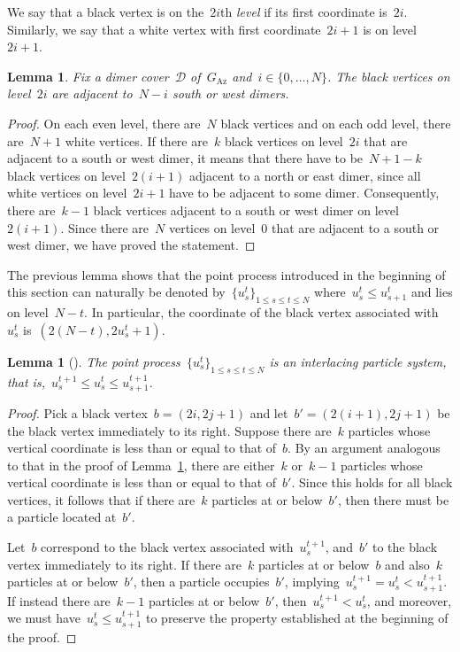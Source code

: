\documentclass[11pt]{article}
\theoremstyle{plain}
\newtheorem{lemma}[theorem]{Lemma}
\theoremstyle{definition}
\numberwithin{equation}{section}
\begin{document}
We say that a black vertex is on the~$2i$th \emph{level} if its first coordinate is~$2i$. Similarly, we say that a white vertex with first coordinate~$2i+1$ is on level~$2i+1$.
\begin{lemma}\label{lem:particles_level}
Fix a dimer cover~$\mathcal D$ of~$G_\text{Az}$ and~$i\in \{0,\dots,N\}$. The black vertices on level~$2i$ are adjacent to~$N-i$ south or west dimers.   
\end{lemma}
\begin{proof}
On each even level, there are~$N$ black vertices and on each odd level, there are~$N+1$ white vertices. If there are~$k$ black vertices on level~$2i$ that are adjacent to a south or west dimer, it means that there have to be~$N+1-k$ black vertices on level~$2(i+1)$ adjacent to a north or east dimer, since all white vertices on level~$2i+1$ have to be adjacent to some dimer. Consequently, there are~$k-1$ black vertices adjacent to a south or west dimer on level~$2(i+1)$. Since there are~$N$ vertices on level~$0$ that are adjacent to a south or west dimer, we have proved the statement.
\end{proof}
The previous lemma shows that the point process introduced in the beginning of this section can naturally be denoted by~$\{u_s^t\}_{1\leq s\leq t\leq N}$ where~$u_s^t\leq u_{s+1}^t$ and lies on level~$N-t$. In particular, the coordinate of the black vertex associated with~$u_s^t$ is~$(2(N-t),2u_s^t+1)$.
\begin{lemma}[\cite{JN06}]
The point process~$\{u_s^t\}_{1\leq s\leq t\leq N}$ is an interlacing particle system, that is,~$u_s^{t+1}\leq u_s^t\leq u_{s+1}^{t+1}$.
\end{lemma}
\begin{proof}
Pick a black vertex~$b=(2i,2j+1)$ and let~$b'=(2(i+1),2j+1)$ be the black vertex immediately to its right. Suppose there are~$k$ particles whose vertical coordinate is less than or equal to that of~$b$. By an argument analogous to that in the proof of Lemma~\ref{lem:particles_level}, there are either~$k$ or~$k-1$ particles whose vertical coordinate is less than or equal to that of~$b'$. Since this holds for all black vertices, it follows that if there are~$k$ particles at or below~$b'$, then there must be a particle located at~$b'$.

Let~$b$ correspond to the black vertex associated with~$u_s^{t+1}$, and~$b'$ to the black vertex immediately to its right. If there are~$k$ particles at or below~$b$ and also~$k$ particles at or below~$b'$, then a particle occupies~$b'$, implying~$u_s^{t+1}=u_s^t<u_{s+1}^{t+1}$. If instead there are~$k-1$ particles at or below~$b'$, then~$u_s^{t+1}<u_s^t$, and moreover, we must have~$u_s^t\leq u_{s+1}^{t+1}$ to preserve the property established at the beginning of the proof.
\end{proof}
\end{document}
